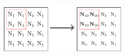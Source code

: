 \documentclass[crop,tikz]{standalone}
\begin{document}
\includegraphics[width=0.18\textwidth]{./tikz/cuadrado1}
\includegraphics[width=0.1\textwidth]{./tikz/flecha}
\hspace{-1pt}
\includegraphics[width=0.18\textwidth]{./tikz/cuadrado3}
\end{document}
